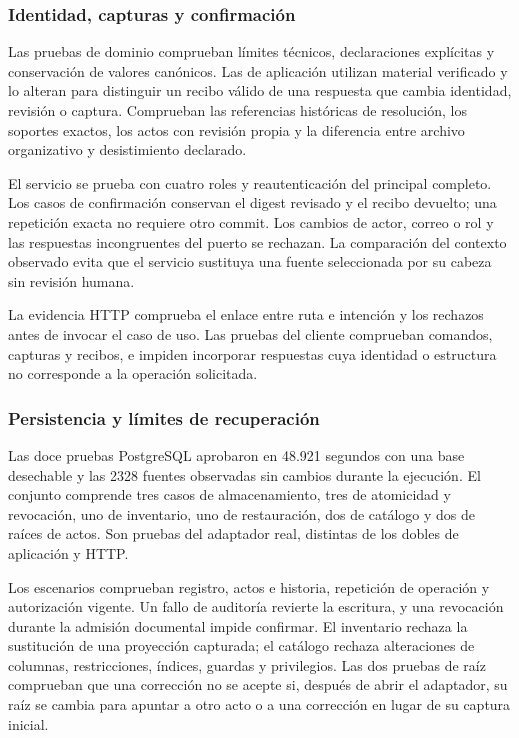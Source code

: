 \subsubsection{Identidad, capturas y confirmación}

Las pruebas de dominio comprueban límites técnicos, declaraciones explícitas y conservación de valores canónicos. Las de aplicación utilizan material verificado y lo alteran para distinguir un recibo válido de una respuesta que cambia identidad, revisión o captura. Comprueban las referencias históricas de resolución, los soportes exactos, los actos con revisión propia y la diferencia entre archivo organizativo y desistimiento declarado.

El servicio se prueba con cuatro roles y reautenticación del principal completo. Los casos de confirmación conservan el digest revisado y el recibo devuelto; una repetición exacta no requiere otro commit. Los cambios de actor, correo o rol y las respuestas incongruentes del puerto se rechazan. La comparación del contexto observado evita que el servicio sustituya una fuente seleccionada por su cabeza sin revisión humana.

La evidencia HTTP comprueba el enlace entre ruta e intención y los rechazos antes de invocar el caso de uso. Las pruebas del cliente comprueban comandos, capturas y recibos, e impiden incorporar respuestas cuya identidad o estructura no corresponde a la operación solicitada.

\subsubsection{Persistencia y límites de recuperación}

Las doce pruebas PostgreSQL aprobaron en 48.921 segundos con una base desechable y las 2328 fuentes observadas sin cambios durante la ejecución. El conjunto comprende tres casos de almacenamiento, tres de atomicidad y revocación, uno de inventario, uno de restauración, dos de catálogo y dos de raíces de actos. Son pruebas del adaptador real, distintas de los dobles de aplicación y HTTP.

Los escenarios comprueban registro, actos e historia, repetición de operación y autorización vigente. Un fallo de auditoría revierte la escritura, y una revocación durante la admisión documental impide confirmar. El inventario rechaza la sustitución de una proyección capturada; el catálogo rechaza alteraciones de columnas, restricciones, índices, guardas y privilegios. Las dos pruebas de raíz comprueban que una corrección no se acepte si, después de abrir el adaptador, su raíz se cambia para apuntar a otro acto o a una corrección en lugar de su captura inicial.

